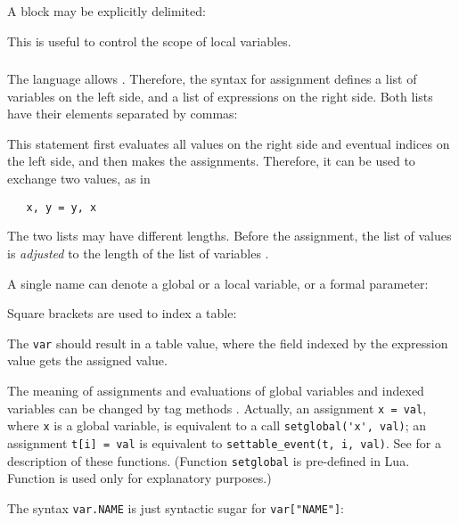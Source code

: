 A block may be explicitly delimited:
\begin{Produc}
\end{Produc}%
This is useful to control the scope of local variables.

\subsubsection{} \label{assignment}
The language allows .
Therefore, the syntax for assignment
defines a list of variables on the left side,
and a list of expressions on the right side.
Both lists have their elements separated by commas:
\begin{Produc}
\end{Produc}%
This statement first evaluates all values on the right side
and eventual indices on the left side,
and then makes the assignments.
Therefore, it can be used to exchange two values, as in
\begin{verbatim}
   x, y = y, x
\end{verbatim}
The two lists may have different lengths.
Before the assignment, the list of values is \emph{adjusted} to
the length of the list of variables .

A single name can denote a global or a local variable,
or a formal parameter:
\begin{Produc}
\end{Produc}%
Square brackets are used to index a table:
\begin{Produc}
\end{Produc}%
The \verb|var| should result in a table value,
where the field indexed by the expression value gets the assigned value.

The meaning of assignments and evaluations of global variables and
indexed variables can be changed by tag methods .
Actually,
an assignment \verb|x = val|, where \verb|x| is a global variable,
is equivalent to a call \verb|setglobal('x', val)|;
an assignment \verb|t[i] = val| is equivalent to
\verb|settable_event(t, i, val)|.
See  for a description of these functions.
(Function \verb|setglobal| is pre-defined in Lua.
Function  is used only for explanatory purposes.)

The syntax \verb|var.NAME| is just syntactic sugar for
\verb|var["NAME"]|:
\begin{Produc}
\end{Produc}%

